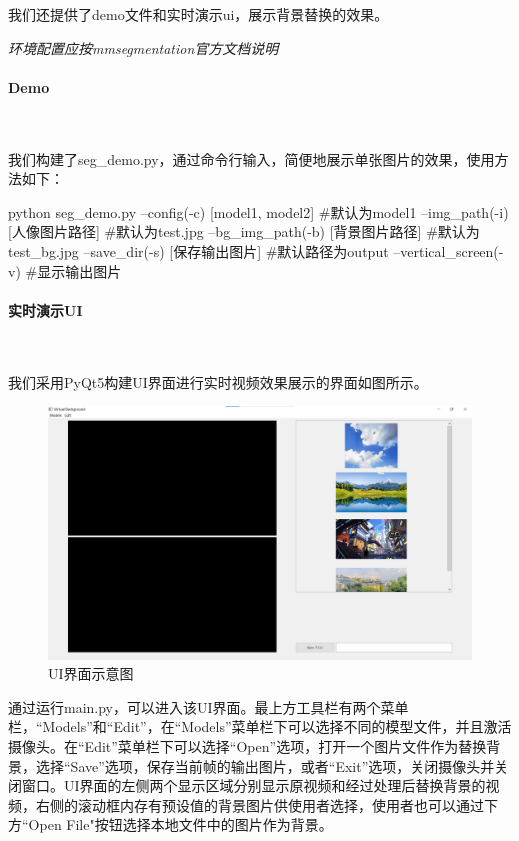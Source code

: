 \documentclass[11pt]{article}
\begin{document}
我们还提供了demo文件和实时演示ui，展示背景替换的效果。

\textit{环境配置应按mmsegmentation官方文档说明}
\paragraph{Demo}~{}

我们构建了seg_demo.py，通过命令行输入，简便地展示单张图片的效果，使用方法如下：

\begin{python}
	python seg_demo.py
	--config(-c) [model1, model2]  		    	#默认为model1
	--img_path(-i) [人像图片路径] 	      #默认为test.jpg
	--bg_img_path(-b) [背景图片路径] 	    #默认为test_bg.jpg
	--save_dir(-s) [保存输出图片]  		    #默认路径为output
	--vertical_screen(-v) 				        #显示输出图片
\end{python}


\paragraph{实时演示UI}~{}

我们采用PyQt5构建UI界面进行实时视频效果展示的界面如图所示。
\begin{figure}[H]
	\centering
	\includegraphics[width = 1\textwidth]{ui.jpg}
	\caption{UI界面示意图}
	\label{fig:image11}
	
\end{figure}
通过运行main.py，可以进入该UI界面。最上方工具栏有两个菜单栏，“Models”和“Edit”，在“Models”菜单栏下可以选择不同的模型文件，并且激活摄像头。在“Edit”菜单栏下可以选择“Open”选项，打开一个图片文件作为替换背景，选择“Save”选项，保存当前帧的输出图片，或者“Exit”选项，关闭摄像头并关闭窗口。UI界面的左侧两个显示区域分别显示原视频和经过处理后替换背景的视频，右侧的滚动框内存有预设值的背景图片供使用者选择，使用者也可以通过下方“Open File"按钮选择本地文件中的图片作为背景。
\end{document}
